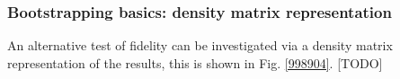 \subsubsection{Bootstrapping basics: density matrix representation}

An alternative test of fidelity can be investigated via a density matrix representation of the results, this is shown in Fig. \ref{998904}. [TODO]